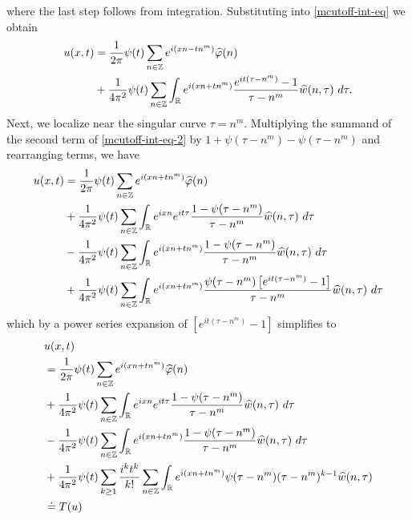 %
%
where the last step follows from integration. Substituting
into \eqref{mcutoff-int-eq} we obtain
%
%
\begin{equation}
	\begin{split}
		\label{mcutoff-int-eq-2}
		u(x, t)
		& = \frac{1}{2 \pi} \psi(t) \sum_{n \in \mathbb{Z}} e^{i(xn - tn^m)} \widehat{\varphi}(n) 
		\\
		& + \frac{1}{4 \pi^2} \psi(t) \sum_{n \in \mathbb{Z}} \int_{\mathbb{R}}
		e^{i(xn + t n^m)} \frac{e^{it(\tau - n^m)}- 1}{\tau - n^m} 
		\widehat{w}(n, \tau) \ d \tau.
	\end{split}
\end{equation}
%
%
%
%
%
Next, we localize near the singular curve $\tau =  n^m$.  Multiplying the
summand of the second term of \eqref{mcutoff-int-eq-2} by $1 + \psi(\tau -
n^m) - \psi(\tau -
n^m) $ and
rearranging terms, we have
%
%
\begin{equation*}
	\begin{split}
		 u(x, t)
		& = \frac{1}{2 \pi} \psi(t) \sum_{n \in \mathbb{Z}} e^{i(xn + t n^{m 
		})} \widehat{\varphi}(n) 
		\\
		& + \frac{1}{4 \pi^2} \psi(t) \sum_{n \in \mathbb{Z}} \int_{\mathbb{R}} e^{ixn}  
		e^{it \tau} \frac{ 1 - \psi(\tau - n^m) 
		}{\tau - n^m} \widehat{w}(n, \tau) \ d \tau
		\\
		& - \frac{1}{4 \pi^2} \psi(t) \sum_{n \in \mathbb{Z}} \int _{\mathbb{R}} e^{i(xn + 
		t n^m)}
		 \frac{1- \psi(\tau - n^m)}{\tau - n^m} \widehat{w}(n, \tau) \ d \tau
		\\
		& + \frac{1}{4 \pi^2} \psi(t) \sum_{n \in \mathbb{Z}} \int_{\mathbb{R}}
		e^{i(xn + t n^m)}
		\frac{\psi(\tau - n^m)\left[ e^{it(\tau - n^m)}-1 
		\right]}{\tau - n^m} \widehat{w}(n, \tau) \ d \tau
	\end{split}
\end{equation*}
%
%
which by a power series expansion of $[e^{it(\tau - n^m)}-1]$ simplifies  
to
%
%
\begin{align}
	\label{mmain-int-expression-0}
	& u(x, t) 
		\\
		\label{mmain-int-expression-1}
		& = \frac{1}{2 \pi} \psi(t) \sum_{n \in \mathbb{Z}} e^{i(xn + tn^{m 
		})} \widehat{\varphi}(n) 
		\\
		\label{mmain-int-expression-2}
		& + \frac{1}{4 \pi^2} \psi(t) \sum_{n\in \mathbb{Z}} \int_{\mathbb{R}} e^{ixn}  
		e^{it \tau} \frac{ 1 - \psi(\tau -  n^m) 
		}{\tau -  n^m} \widehat{w}(n, \tau) \ d \tau
		\\
		\label{mmain-int-expression-3}
		& - \frac{1}{4 \pi^2} \psi(t) \sum_{n\in \mathbb{Z}} \int_{\mathbb{R}} e^{i(xn + 
		t n^m)}
		 \frac{1- \psi(\tau -  n^m)}{\tau -  n^m} \widehat{w}(n, \tau) \ d \tau
		\\
		\label{mmain-int-expression-4}
		& + \frac{1}{4 \pi^2} \psi(t) \sum_{k \ge 1} \frac{i^k t^k}{k!}
		\sum_{n \in \mathbb{Z}} \int_{\mathbb{R}} e^{i(xn + t n^m )}
		\psi(\tau -  n^m) (\tau -  n^m)^{k-1} \widehat{w}(n, \tau)  
		\\
		& \doteq T(u) \notag
\end{align}
